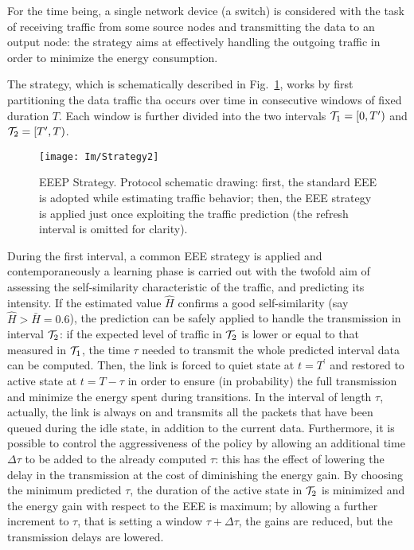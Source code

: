 \documentclass[journal,10pt,twoside,final]{IEEEtran}
\begin{document}
For the time being, a single network device (a switch) is considered with the task of receiving traffic from some source nodes and transmitting the data to an output node: the strategy aims at effectively handling the outgoing traffic in order to minimize the energy consumption.

The strategy, which is schematically described in Fig.~\ref{fig:EEEP}, works by first partitioning the data traffic tha occurs over time in consecutive windows of fixed duration $T$. Each window is further divided into the two intervals ${\cal T}_1=\left[0,T^\prime\right)$ and ${\cal T}_2=\left[T^\prime, T\right)$.
\begin{figure}[ht!]
\centering
\texttt{[image: Im/Strategy2]}
\vspace{-0.0cm}
\caption{EEEP Strategy. Protocol schematic drawing: first, the standard EEE is adopted while estimating traffic behavior; then, the EEE strategy is applied just once exploiting the traffic prediction (the refresh interval is omitted for clarity).}
\label{fig:EEEP}
\end{figure}

During the first interval, a common EEE strategy is applied and contemporaneously a learning phase is carried out with the twofold aim of assessing the self-similarity characteristic of the traffic, and predicting its intensity. If the estimated value $\hat H$ confirms a good self-similarity (say $\hat H > \bar H =0.6$), 
the prediction can be safely applied to handle the transmission in interval ${\cal T}_2$: if the expected level of traffic in ${\cal T}_2$ is lower or equal to that measured in ${\cal T}_1$, the time $\tau$ needed to transmit the whole predicted interval data can be computed. 
Then, the link is forced to quiet state at $t=T^\prime$ and restored to active state at $t=T-\tau$ in order to ensure (in probability) the full transmission and minimize the energy spent during transitions.  
In the interval of length $\tau$, actually, the link is always on and transmits all the packets that have been queued during the idle state, in addition to the current data. 
Furthermore, it is possible to control the aggressiveness of the policy by allowing an additional time $\Delta \tau$ to be added to the already computed $\tau$: this has the effect of lowering the delay in the transmission at the cost of diminishing the energy gain.
By choosing the minimum predicted $\tau$, the duration of the active state in ${\cal T}_2$ is minimized and the energy gain with respect to the EEE is maximum; by allowing a further increment to $\tau$, that is setting a window $\tau + \Delta\tau$, the gains are reduced, but the transmission delays are lowered.
\end{document}
